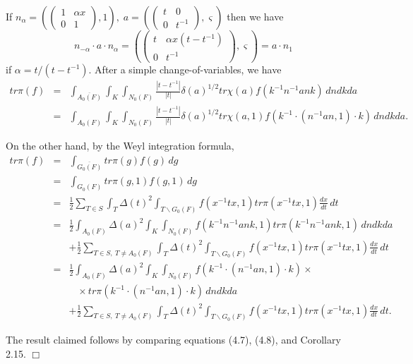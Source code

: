If $n_\alpha =(\left( 
\begin{array}{cc}
1 & \alpha x \\ 
0 & 1
\end{array}
\right) ,1),\;a=(\left( 
\begin{array}{cc}
t & 0 \\ 
0 & t^{-1}
\end{array}
\right) ,\varsigma )$ then we have 
\[
n_{-\alpha }\cdot a\cdot n_\alpha =(\left( 
\begin{array}{cc}
t & \alpha x(t-t^{-1}) \\ 
0 & t^{-1}
\end{array}
\right) ,\varsigma )=a\cdot n_1 
\]
if $\alpha =t/(t-t^{-1})$. After a simple change-of-variables, we have 
\begin{eqnarray}
tr\pi (f) &=&\int_{\overline{A_0(F)}}\int_K\int_{N_0(F)}\frac{|t-t^{-1}|}{|t|%
}\delta (a)^{1/2}tr\chi (a)f(k^{-1}n^{-1}ank)\, dndkda \\
&=&\int_{A_0(F)}\int_K\int_{N_0(F)}\frac{|t-t^{-1}|}{|t|}\delta
(a)^{1/2}tr\chi (a,1)f(k^{-1}\cdot (n^{-1}an,1)\cdot k)\, dndkda.  \nonumber
\end{eqnarray}

On the other hand, by the Weyl integration formula, 
\begin{eqnarray}
tr\pi (f) &=&\int_{\overline{G_0(F)}}tr\pi (g)f(g)\, dg  \nonumber \\
&=&\int_{G_0(F)}tr\pi (g,1)f(g,1)\, dg  \nonumber \\
&=&\frac 12\sum_{T\in S}\int_T\Delta (t)^2\int_{T\backslash
G_0(F)}f(x^{-1}tx,1)tr\pi (x^{-1}tx,1)\frac{dx}{dt}\, dt  \nonumber \\
&=&\frac 12\int_{A_0(F)}\Delta
(a)^2\int_K\int_{N_0(F)}f(k^{-1}n^{-1}ank,1)tr\pi (k^{-1}n^{-1}ank,1)\, dndkda 
\nonumber \\
&&+\frac 12\sum_{T\in S,\  T\neq A_0(F)} \int_T\Delta
(t)^2\int_{T\backslash G_0(F)}f(x^{-1}tx,1)tr\pi (x^{-1}tx,1)\frac{dx}{dt}\, dt
\nonumber \\
&=&\frac 12\int_{A_0(F)}\Delta (a)^2\int_K\int_{N_0(F)}f(k^{-1}\cdot
(n^{-1}an,1)\cdot k)\times  \nonumber \\
&&\;\;\;\times tr\pi (k^{-1}\cdot (n^{-1}an,1)\cdot k)\, dndkda \\
&&+\frac 12\sum_{T\in S,\ T\neq A_0(F)} \int_T\Delta
(t)^2\int_{T\backslash G_0(F)}f(x^{-1}tx,1)tr\pi (x^{-1}tx,1)\frac{dx}{dt}\, dt.
\nonumber
\end{eqnarray}

The result claimed follows by comparing equations (4.7), (4.8), and
Corollary 2.15. $\Box $

